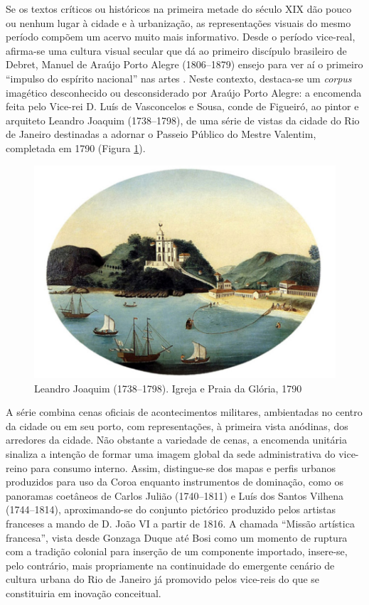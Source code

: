 Se os textos críticos ou históricos na primeira metade do século XIX dão
pouco ou nenhum lugar à cidade e à urbanização, as representações
visuais do mesmo período compõem um acervo muito mais informativo. Desde
o período vice-real, afirma-se uma cultura visual secular que dá ao
primeiro discípulo brasileiro de Debret, Manuel de Araújo Porto Alegre
(1806--1879) ensejo para ver aí o primeiro ``impulso do espírito
nacional'' nas artes \autocite[p.~50]{magalhaes:1834resume}. Neste
contexto, destaca-se um \emph{corpus} imagético desconhecido ou
desconsiderado por Araújo Porto Alegre: a encomenda feita pelo Vice-rei
D. Luís de Vasconcelos e Sousa, conde de Figueiró, ao pintor e arquiteto
Leandro Joaquim (1738--1798), de uma série de vistas da cidade do Rio de
Janeiro destinadas a adornar o Passeio Público do Mestre Valentim,
completada em 1790 (Figura \ref{fig:joaquim}).

\begin{figure}
\hypertarget{fig:joaquim}{%
\centering
\includegraphics{figures/LeandroJoaquim-Gloria.jpg}
\caption{Leandro Joaquim (1738--1798). Igreja e Praia da Glória,
1790}\label{fig:joaquim}
}
\end{figure}

A série combina cenas oficiais de acontecimentos militares, ambientadas
no centro da cidade ou em seu porto, com representações, à primeira
vista anódinas, dos arredores da cidade. Não obstante a variedade de
cenas, a encomenda unitária sinaliza a intenção de formar uma imagem
global da sede administrativa do vice-reino para consumo interno. Assim,
distingue-se dos mapas e perfis urbanos produzidos para uso da Coroa
enquanto instrumentos de dominação, como os panoramas coetâneos de
Carlos Julião (1740--1811) e Luís dos Santos Vilhena (1744--1814),
aproximando-se do conjunto pictórico produzido pelos artistas franceses
a mando de D. João VI a partir de 1816. A chamada ``Missão artística
francesa'', vista desde Gonzaga Duque
\autocite[p.~257]{gonzagaduque:1995arte} até Bosi
\autocite[p.~228]{bosi:2011cultura} como um momento de ruptura com a
tradição colonial para inserção de um componente importado, insere-se,
pelo contrário, mais propriamente na continuidade do emergente cenário
de cultura urbana do Rio de Janeiro já promovido pelos vice-reis do que
se constituiria em inovação conceitual.

